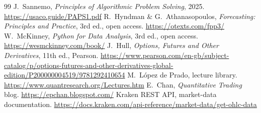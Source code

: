 \begin{thebibliography}{99}
 J.~Sannemo, \emph{Principles of Algorithmic Problem Solving}, 2025. \url{https://usaco.guide/PAPS1.pdf}
 R.~Hyndman \& G.~Athanasopoulos, \emph{Forecasting: Principles and Practice}, 3rd ed., open access. \url{https://otexts.com/fpp3/}
 W.~McKinney, \emph{Python for Data Analysis}, 3rd ed., open access. \url{https://wesmckinney.com/book/}
 J.~Hull, \emph{Options, Futures and Other Derivatives}, 11th ed., Pearson. \url{https://www.pearson.com/en-gb/subject-catalog/p/options-futures-and-other-derivatives-global-edition/P200000004519/9781292410654}
 M.~L\'opez de Prado, lecture library. \url{https://www.quantresearch.org/Lectures.htm}
 E.~Chan, \emph{Quantitative Trading} blog. \url{https://epchan.blogspot.com/}
 Kraken REST API, market-data documentation. \url{https://docs.kraken.com/api-reference/market-data/get-ohlc-data}
\end{thebibliography}
